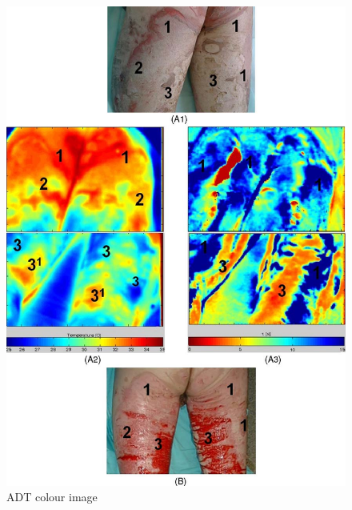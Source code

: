 \documentclass[paper=letter, fontsize=11pt]{scrartcl}
\numberwithin{equation}{section}		%
\numberwithin{figure}{section}			%
\numberwithin{table}{section}			%
\begin{document}
\begin{figure}[H]
\begin{minipage}[t]{0.44\textwidth}
        \includegraphics[scale=0.2]{ADT_colour_image.jpg}
        \caption{ADT colour image}
    \end{minipage}
\end{figure}
\pagebreak
\end{document}
